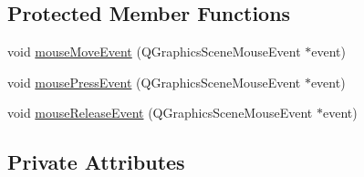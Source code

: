 \subsection*{Protected Member Functions}
\begin{DoxyCompactItemize}
\item 
void \hyperlink{classCGraphicsItem_a670472b11f99123fd81cc1f0998405b8}{mouseMoveEvent} (QGraphicsSceneMouseEvent $\ast$event)
\item 
void \hyperlink{classCGraphicsItem_adbbe3716e050a386328c4c04af24eb22}{mousePressEvent} (QGraphicsSceneMouseEvent $\ast$event)
\item 
void \hyperlink{classCGraphicsItem_ac264e38927e3a97005305b544344b624}{mouseReleaseEvent} (QGraphicsSceneMouseEvent $\ast$event)
\end{DoxyCompactItemize}
\subsection*{Private Attributes}
